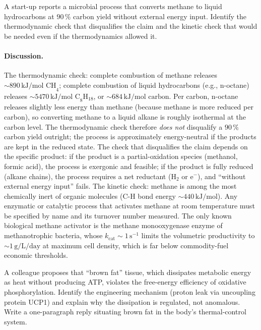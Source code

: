 \begin{exercise}
A start-up reports a microbial process that converts methane to
liquid hydrocarbons at $90\,\%$ carbon yield without external energy
input. Identify the thermodynamic check that disqualifies the claim
and the kinetic check that would be needed even if the thermodynamics
allowed it.
\end{exercise}

\paragraph{Discussion.}
The thermodynamic check: complete combustion of methane releases
$\sim 890\,\text{kJ/mol CH}_4$; complete combustion of liquid
hydrocarbons (e.g., n-octane) releases $\sim 5470\,\text{kJ/mol C}_8\text{H}_{18}$,
or $\sim 684\,\text{kJ/mol carbon}$. Per carbon, n-octane releases
slightly less energy than methane (because methane is more reduced
per carbon), so converting methane to a liquid alkane is roughly
isothermal at the carbon level. The thermodynamic check therefore
\emph{does not} disqualify a $90\,\%$ carbon yield outright; the
process is approximately energy-neutral if the products are kept in
the reduced state. The check that disqualifies the claim depends on
the specific product: if the product is a partial-oxidation species
(methanol, formic acid), the process is exergonic and feasible; if
the product is fully reduced (alkane chains), the process requires
a net reductant (H$_2$ or e$^-$), and ``without external energy
input'' fails. The kinetic check: methane is among the most
chemically inert of organic molecules ($\text{C-H}$ bond energy
$\sim 440\,\text{kJ/mol}$). Any enzymatic or catalytic process that
activates methane at room temperature must be specified by name and
its turnover number measured. The only known biological methane
activator is the methane monooxygenase enzyme of methanotrophic
bacteria, whose $k_{\text{cat}} \sim 1\,\text{s}^{-1}$ limits the
volumetric productivity to $\sim 1\,\text{g/L/day}$ at maximum cell
density, which is far below commodity-fuel economic thresholds.

\begin{exercise}
A colleague proposes that ``brown fat'' tissue, which dissipates
metabolic energy as heat without producing ATP, violates the
free-energy efficiency of oxidative phosphorylation. Identify the
engineering mechanism (proton leak via uncoupling protein UCP1) and
explain why the dissipation is regulated, not anomalous. Write a
one-paragraph reply situating brown fat in the body's thermal-control
system.
\end{exercise}

